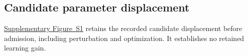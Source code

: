 \subsection{Candidate parameter displacement}\label{app:parameter-displacement}

\href{eurekazero_supplement.pdf#supp-parameter-displacement}{Supplementary Figure~S1} retains the recorded
candidate displacement before admission, including perturbation and
optimization. It establishes no retained learning gain.
